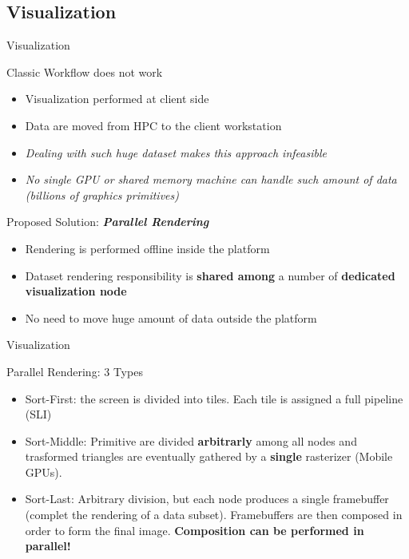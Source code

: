 \documentclass{beamer}
\begin{document}
\subsection{Visualization}
  \begin{frame}{Visualization}
		\begin{exampleblock}{Classic Workflow does not work}
	\begin{itemize}
		\item Visualization performed at client side
		\item Data are moved from HPC to the client workstation
	
		\item \textit{Dealing with such huge dataset makes this approach infeasible}
		\item \textit{No single GPU or shared memory machine can handle such amount of data (billions of graphics primitives)}
	\end{itemize}


		\end{exampleblock}	
		\begin{alertblock}{Proposed Solution: \textit{\textbf{Parallel Rendering}}}
	\begin{itemize}
		\item Rendering is performed offline inside the platform
		\item Dataset rendering responsibility is \textbf{shared among} a number of \textbf{dedicated visualization node}
		\item No need to move huge amount of data outside the platform
	\end{itemize}


	\end{alertblock}	
		

\end{frame} %


  \begin{frame}{Visualization}
		\begin{exampleblock}{Parallel Rendering: $3$ Types}
		\begin{itemize}
			\item Sort-First: the screen is divided into tiles. Each tile is assigned a full pipeline  (SLI)
			\item Sort-Middle: Primitive are divided \textbf{arbitrarly} among all nodes and  trasformed triangles are eventually gathered by a \textbf{single} rasterizer (Mobile GPUs).
			\item Sort-Last: Arbitrary division, but each node produces a single framebuffer  (complet the rendering of a data subset). Framebuffers are then composed in order to form the final image. \textbf{Composition can be performed in parallel!} 
		\end{itemize}

		\end{exampleblock}	
	
		

\end{frame} %
\end{document}

